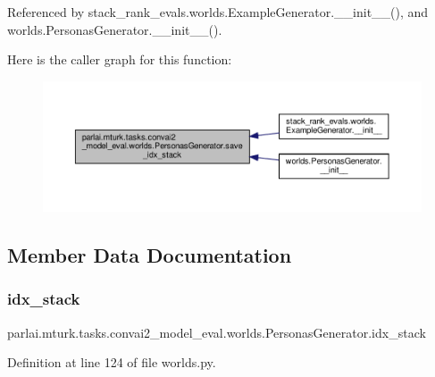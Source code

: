 Referenced by stack\+\_\+rank\+\_\+evals.\+worlds.\+Example\+Generator.\+\_\+\+\_\+init\+\_\+\+\_\+(), and worlds.\+Personas\+Generator.\+\_\+\+\_\+init\+\_\+\+\_\+().

Here is the caller graph for this function\+:
\nopagebreak
\begin{figure}[H]
\begin{center}
\leavevmode
\includegraphics[width=350pt]{classparlai_1_1mturk_1_1tasks_1_1convai2__model__eval_1_1worlds_1_1PersonasGenerator_a73147a14066f719d65b627877cfa13f6_icgraph}
\end{center}
\end{figure}


\subsection{Member Data Documentation}
\mbox{\label{classparlai_1_1mturk_1_1tasks_1_1convai2__model__eval_1_1worlds_1_1PersonasGenerator_a09df2c36e5bfd5ece1815ae8e804fe03}} 
\subsubsection{\texorpdfstring{idx\+\_\+stack}{idx\_stack}}
{\footnotesize\ttfamily parlai.\+mturk.\+tasks.\+convai2\+\_\+model\+\_\+eval.\+worlds.\+Personas\+Generator.\+idx\+\_\+stack}



Definition at line 124 of file worlds.\+py.



